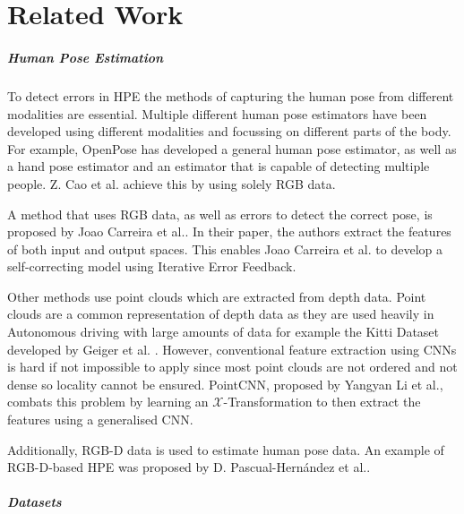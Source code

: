 \chapter{Related Work}
\label{sec:related_work}

\paragraph{Human Pose Estimation}

To detect errors in HPE the methods of capturing the human pose from different modalities are essential. Multiple different human pose estimators have been developed using different modalities and focussing on different parts of the body. For example, OpenPose has developed a general human pose estimator\cite{OpenPosePose}, as well as a hand pose estimator\cite{OpenPoseHand} and an estimator that is capable of detecting multiple people\cite{OpenPoseMulti}. Z. Cao et al. achieve this by using solely RGB data.

A method that uses RGB data, as well as errors to detect the correct pose, is proposed by Joao Carreira et al.\cite{IterativeErrorFeedback}. In their paper, the authors extract the features of both input and output spaces. This enables Joao Carreira et al. to develop a self-correcting model using Iterative Error Feedback.

Other methods use point clouds which are extracted from depth data. Point clouds are a common representation of depth data as they are used heavily in Autonomous driving with large amounts of data for example the Kitti Dataset developed by Geiger et al. \cite{Geiger2012CVPR}. However, conventional feature extraction using CNNs is hard if not impossible to apply since most point clouds are not ordered and not dense so locality cannot be ensured. PointCNN, proposed by Yangyan Li et al.\cite{li2018pointcnn}, combats this problem by learning an $\mathcal{X}$-Transformation to then extract the features using a generalised CNN.

Additionally, RGB-D data is used to estimate human pose data. An example of RGB-D-based HPE was proposed by D. Pascual-Hernández et al.\cite{PASCUALHERNANDEZ2022102225}.

\paragraph{Datasets}

